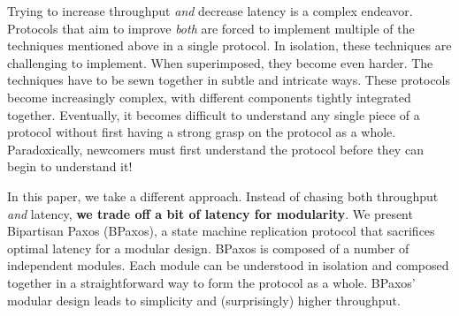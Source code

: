 Trying to increase throughput \emph{and} decrease latency is a complex
endeavor. Protocols that aim to improve \emph{both} are forced to implement
multiple of the techniques mentioned above in a single protocol. In isolation,
these techniques are challenging to implement. When superimposed, they become
even harder. The techniques have to be sewn together in subtle and intricate
ways. These protocols become increasingly complex, with different components
tightly integrated together. Eventually, it becomes difficult to understand any
single piece of a protocol without first having a strong grasp on
the protocol as a whole. Paradoxically, newcomers must first understand the
protocol before they can begin to understand it!

In this paper, we take a different approach. Instead of chasing both throughput
\emph{and} latency, \textbf{we trade off a bit of latency for modularity}. We
present Bipartisan Paxos (BPaxos), a state machine replication protocol that
sacrifices optimal latency for a modular design. BPaxos is composed of a number
of independent modules. Each module can be understood in isolation and composed
together in a straightforward way to form the protocol as a whole. BPaxos'
modular design leads to simplicity and (surprisingly) higher throughput.

%
%

